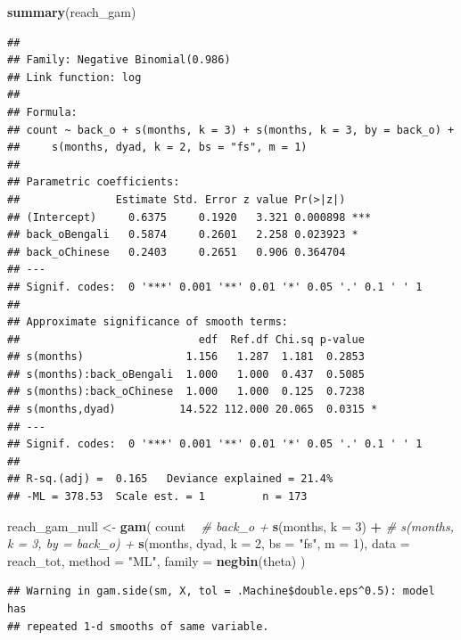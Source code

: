 \documentclass[]{article}
\newenvironment{Shaded}{\begin{snugshade}}{\end{snugshade}}
\newcommand{\CommentTok}[1]{\textcolor[rgb]{0.56,0.35,0.01}{\textit{#1}}}
\newcommand{\DataTypeTok}[1]{\textcolor[rgb]{0.13,0.29,0.53}{#1}}
\newcommand{\DecValTok}[1]{\textcolor[rgb]{0.00,0.00,0.81}{#1}}
\newcommand{\KeywordTok}[1]{\textcolor[rgb]{0.13,0.29,0.53}{\textbf{#1}}}
\newcommand{\NormalTok}[1]{#1}
\newcommand{\OperatorTok}[1]{\textcolor[rgb]{0.81,0.36,0.00}{\textbf{#1}}}
\newcommand{\StringTok}[1]{\textcolor[rgb]{0.31,0.60,0.02}{#1}}
\begin{document}
\begin{Shaded}
\begin{Highlighting}[]
\KeywordTok{summary}\NormalTok{(reach_gam)}
\end{Highlighting}
\end{Shaded}

\begin{verbatim}
## 
## Family: Negative Binomial(0.986) 
## Link function: log 
## 
## Formula:
## count ~ back_o + s(months, k = 3) + s(months, k = 3, by = back_o) + 
##     s(months, dyad, k = 2, bs = "fs", m = 1)
## 
## Parametric coefficients:
##               Estimate Std. Error z value Pr(>|z|)    
## (Intercept)     0.6375     0.1920   3.321 0.000898 ***
## back_oBengali   0.5874     0.2601   2.258 0.023923 *  
## back_oChinese   0.2403     0.2651   0.906 0.364704    
## ---
## Signif. codes:  0 '***' 0.001 '**' 0.01 '*' 0.05 '.' 0.1 ' ' 1
## 
## Approximate significance of smooth terms:
##                            edf  Ref.df Chi.sq p-value  
## s(months)                1.156   1.287  1.181  0.2853  
## s(months):back_oBengali  1.000   1.000  0.437  0.5085  
## s(months):back_oChinese  1.000   1.000  0.125  0.7238  
## s(months,dyad)          14.522 112.000 20.065  0.0315 *
## ---
## Signif. codes:  0 '***' 0.001 '**' 0.01 '*' 0.05 '.' 0.1 ' ' 1
## 
## R-sq.(adj) =  0.165   Deviance explained = 21.4%
## -ML = 378.53  Scale est. = 1         n = 173
\end{verbatim}

\begin{Shaded}
\begin{Highlighting}[]
\NormalTok{reach_gam_null <-}\StringTok{ }\KeywordTok{gam}\NormalTok{(}
\NormalTok{  count }\OperatorTok{~}
\StringTok{    }\CommentTok{# back_o +}
\StringTok{    }\KeywordTok{s}\NormalTok{(months, }\DataTypeTok{k =} \DecValTok{3}\NormalTok{) }\OperatorTok{+}
\StringTok{    }\CommentTok{# s(months, k = 3, by = back_o) +}
\StringTok{    }\KeywordTok{s}\NormalTok{(months, dyad, }\DataTypeTok{k =} \DecValTok{2}\NormalTok{, }\DataTypeTok{bs =} \StringTok{"fs"}\NormalTok{, }\DataTypeTok{m =} \DecValTok{1}\NormalTok{),}
  \DataTypeTok{data =}\NormalTok{ reach_tot,}
  \DataTypeTok{method =} \StringTok{"ML"}\NormalTok{,}
  \DataTypeTok{family =} \KeywordTok{negbin}\NormalTok{(theta)}
\NormalTok{)}
\end{Highlighting}
\end{Shaded}

\begin{verbatim}
## Warning in gam.side(sm, X, tol = .Machine$double.eps^0.5): model has
## repeated 1-d smooths of same variable.
\end{verbatim}
\end{document}
